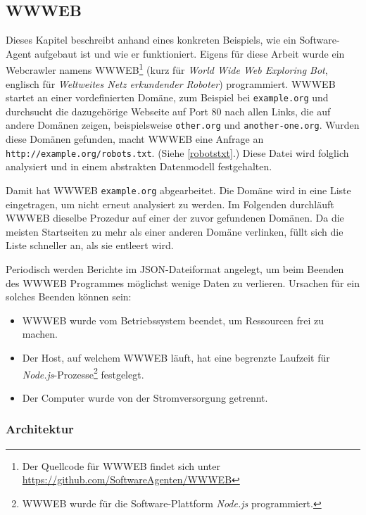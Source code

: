 \subsection{WWWEB}
\label{sub:wwweb}

Dieses Kapitel beschreibt anhand eines konkreten Beispiels, wie ein
Software-Agent aufgebaut ist und wie er funktioniert. Eigens für diese Arbeit
wurde ein Webcrawler namens WWWEB\footnote{Der Quellcode für WWWEB findet
sich unter \url{https://github.com/SoftwareAgenten/WWWEB}} (kurz für
\emph{World Wide Web Exploring Bot}, englisch für \emph{Weltweites Netz
erkundender Roboter}) programmiert. WWWEB startet an einer vordefinierten
Domäne, zum Beispiel bei \texttt{example.org} und durchsucht die dazugehörige
Webseite auf Port 80 nach allen Links, die auf andere Domänen zeigen,
beispielsweise \texttt{other.org} und \texttt{another-one.org}. Wurden diese
Domänen gefunden, macht WWWEB eine Anfrage an
\texttt{http://example.org/robots.txt}. (Siehe \ref{robotstxt}.) Diese Datei wird
folglich analysiert und in einem abstrakten Datenmodell festgehalten.

Damit hat WWWEB \texttt{example.org} abgearbeitet. Die Domäne wird in eine
Liste eingetragen, um nicht erneut analysiert zu werden. Im Folgenden
durchläuft WWWEB dieselbe Prozedur auf einer der zuvor gefundenen Domänen. Da
die meisten Startseiten zu mehr als einer anderen Domäne verlinken, füllt sich
die Liste schneller an, als sie entleert wird.

Periodisch werden Berichte im JSON-Dateiformat angelegt, um beim Beenden des
WWWEB Programmes möglichst wenige Daten zu verlieren. Ursachen für ein solches
Beenden können sein:

\begin{itemize}
\item
  WWWEB wurde vom Betriebssystem beendet, um Ressourcen frei zu machen.
\item
  Der Host, auf welchem WWWEB läuft, hat eine begrenzte Laufzeit für
  \emph{Node.js}-Prozesse\footnote{WWWEB wurde für die Software-Plattform
  \emph{Node.js} programmiert.} festgelegt.
\item
  Der Computer wurde von der Stromversorgung getrennt.
\end{itemize}

\subsubsection{Architektur}
\label{ssub:wwweb_architektur}

